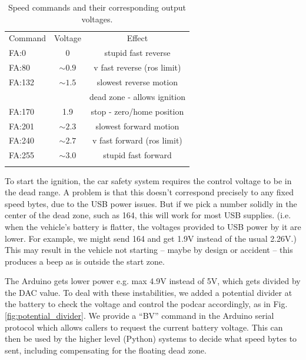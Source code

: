 \documentclass[a4paper]{article}
\begin{document}
\begin{table}
\begin{center}
	\caption{Speed commands and their corresponding output voltages.}
	\label{tab:speed_commands}
	\begin{tabular}{ l c c }
		\hline
		Command   &    Voltage            &  Effect \\
		FA:0      &    0                  & stupid fast reverse  \\
		FA:80     &    $\sim 0.9$         & v fast reverse (ros limit) \\
		FA:132    &   $\sim 1.5$          & slowest reverse motion  \\
		&                       & dead zone - allows ignition \\
		FA:170    &    1.9                & stop - zero/home position \\
		FA:201    &    $\sim 2.3$         & slowest forward motion \\
		FA:240    &    $\sim 2.7$         & v fast forward (ros limit) \\
		FA:255    &    $\sim 3.0$         & stupid fast forward \\
		\hline\\
	\end{tabular}
\end{center}    
\end{table}

To start the ignition, the car safety system requires the control voltage to be in the dead range. A problem is that this doesn’t correspond precisely to any fixed speed bytes, due to the USB power issues.  But if we pick a number solidly in the center of the dead zone, such as 164, this will work for most USB supplies. (i.e. when the vehicle’s battery is flatter, the voltages provided to USB power by it are lower. For example, we might send 164 and get 1.9V instead of the usual 2.26V.) This may result in the vehicle not starting -- maybe by design or accident -- this produces a beep as is outside the start zone. 

The Arduino gets lower power e.g. max 4.9V instead of 5V, which gets divided by the DAC value. To deal with these instabilities, we added a potential divider at the battery to check the voltage and control the podcar accordingly, as in Fig. \ref{fig:potential_divider}. We provide a “BV” command in the Arduino serial protocol which allows callers to request the current battery voltage. This can then be used by the higher level (Python) systems to decide what speed bytes to sent, including compensating for the floating dead zone.
\end{document}
